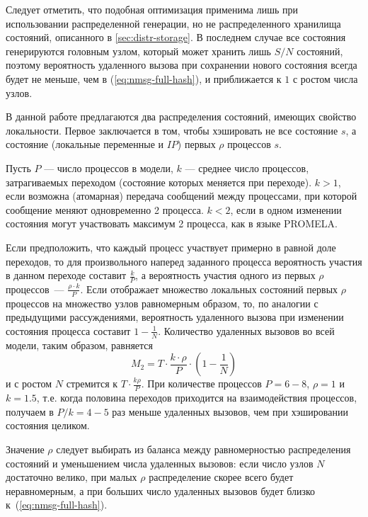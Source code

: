 Следует отметить, что подобная оптимизация применима лишь при использовании распределенной
генерации, но не распределенного хранилища состояний, описанного в
\ref{sec:distr-storage}. В последнем случае все состояния генерируются головным узлом,
который может хранить лишь $S/N$ состояний, поэтому вероятность удаленного вызова при
сохранении нового состояния всегда будет не меньше, чем в (\ref{eq:nmsg-full-hash}), и
приближается к $1$ с ростом числа узлов.

В данной работе предлагаются два распределения состояний, имеющих свойство
локальности. Первое заключается в том, чтобы хэшировать не все состояние $s$, а состояние
(локальные переменные и $IP$) первых $\rho$ процессов $s$.

Пусть $P$ — число процессов в модели, $k$ — среднее число процессов, затрагиваемых
переходом (состояние которых меняется при переходе). $k > 1$, если возможна (атомарная)
передача сообщений между процессами, при которой сообщение меняют одновременно 2
процесса. $k < 2$, если в одном изменении состояния могут участвовать максимум 2 процесса,
как в языке PROMELA.

Если предположить, что каждый процесс участвует примерно в равной доле переходов, то для
произвольного наперед заданного процесса вероятность участия в данном переходе составит
$\frac{k}{P}$, а вероятность участия одного из первых $\rho$ процессов~--- $\frac{\rho\cdot
  k}{P}$. Если  отображает множество локальных состояний первых $\rho$
процессов на множество узлов равномерным образом, то, по аналогии с предыдущими
рассуждениями, вероятность удаленного вызова при изменении состояния процесса составит $1
- \frac{1}{N}$. Количество удаленных вызовов во всей модели, таким образом, равняется
\begin{equation}
  \label{eq:nmsg-firstproc-hash}
  M_2 = T \cdot \frac{k\cdot\rho}{P} \cdot (1 - \frac{1}{N})
\end{equation}
и с ростом $N$ стремится к $T \cdot \frac{k\rho}{P}$. При количестве процессов $P = 6-8$,
$\rho = 1$ и $k = 1.5$, т.е. когда половина переходов приходится на взаимодействия
процессов, получаем в $P/k = 4-5$ раз меньше удаленных вызовов, чем при хэшировании
состояния целиком.

Значение $\rho$ следует выбирать из баланса между равномерностью распределения состояний и
уменьшением числа удаленных вызовов: если число узлов $N$ достаточно велико, при малых
$\rho$ распределение скорее всего будет неравномерным, а при больших число удаленных
вызовов будет близко к~(\ref{eq:nmsg-full-hash}).

